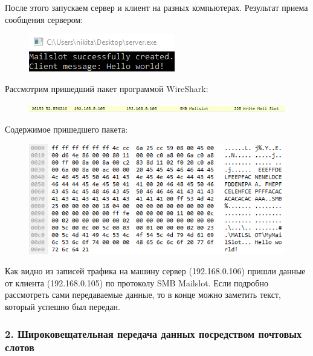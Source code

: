 \documentclass[14pt,a4paper,report]{report}
\begin{document}
После этого запускаем сервер и клиент на разных компьютерах. Результат приема сообщения сервером:

\begin{figure}[h!]
	\centering
	\includegraphics[scale = 1.2]{images/p6_2_result.png}
	
	\caption{}
	\label{image:27}
\end{figure}

Рассмотрим пришедший пакет программой WireShark:

\begin{figure}[h!]
	\centering
	\includegraphics[scale = 0.9]{images/p6_2_wireshark_ip.png}
	
	\caption{}
	\label{image:28}
\end{figure}

\clearpage

Содержимое пришедшего пакета:

\begin{figure}[h!]
	\centering
	\includegraphics[scale = 0.85]{images/p6_2_wireshark_package.png}
	
	\caption{}
	\label{image:29}
\end{figure}

Как видно из записей трафика на машину сервер (192.168.0.106) пришли данные от клиента (192.168.0.105) по протоколу SMB Mailslot. Если подробно рассмотреть сами передаваемые данные, то в конце можно заметить текст, который успешно был передан.

\subsubsection{2. Широковещательная передача данных посредством почтовых слотов}
\end{document}

